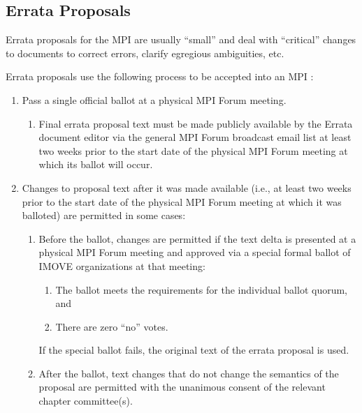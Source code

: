 
\subsection{Errata Proposals}

Errata proposals for the MPI {\color{red}{Standard Documents}} are usually ``small''
and deal with ``critical'' changes to documents to correct errors,
clarify egregious ambiguities, etc.

Errata proposals use the following process to be accepted into an MPI
{\color{red}{Standard Document}}:

\begin{enumerate}

\item Pass a single official ballot at a physical MPI Forum meeting.
  \begin{enumerate}
  \item Final errata proposal text must be made publicly available by
    the Errata document editor via the general MPI Forum broadcast
    email list at least two weeks prior to the start date of the
    physical MPI Forum meeting at which its ballot will occur.
  \end{enumerate}

\item Changes to proposal text after it was made available (i.e., at
  least two weeks prior to the start date of the physical MPI Forum
  meeting at which it was balloted) are permitted in some cases:
  \begin{enumerate}
  \item Before the ballot, changes are permitted if the text delta is
    presented at a physical MPI Forum meeting and approved via a
    special formal ballot of IMOVE organizations at that meeting:
    \begin{enumerate}
    \item The ballot meets the requirements for the individual
      ballot quorum, and
    \item There are zero ``no'' votes.
    \end{enumerate}
    
    If the special ballot fails, the original text of the errata
    proposal is used.
  \item After the ballot, text changes that do not change the
    semantics of the proposal are permitted with the unanimous consent
    of the relevant chapter committee(s).
  \end{enumerate}
\end{enumerate}

